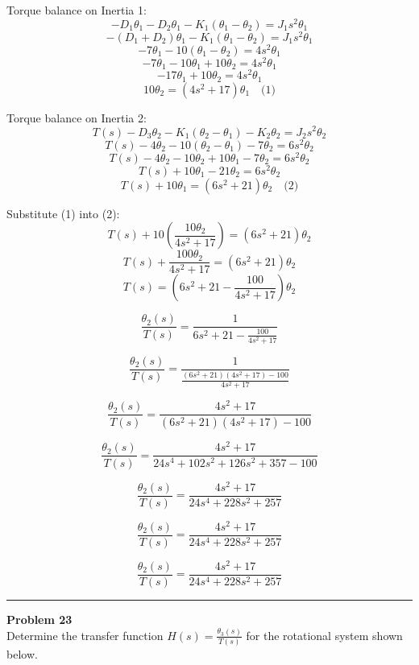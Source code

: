Torque balance on Inertia 1:
\[
- D_1 \theta_1 - D_2 \theta_1 - K_1 (\theta_1 - \theta_2) = J_1 s^2 \theta_1
\]
\[
- (D_1 + D_2)\theta_1 - K_1(\theta_1 - \theta_2) = J_1 s^2 \theta_1
\]
\[
-7\theta_1 - 10(\theta_1 - \theta_2) = 4s^2 \theta_1
\]
\[
-7\theta_1 - 10\theta_1 + 10\theta_2 = 4s^2 \theta_1
\]
\[
-17\theta_1 + 10\theta_2 = 4s^2 \theta_1
\]
\[
10\theta_2 = (4s^2 + 17)\theta_1 \quad \text{(1)}
\]

Torque balance on Inertia 2:
\[
T(s) - D_3 \theta_2 - K_1 (\theta_2 - \theta_1) - K_2 \theta_2 = J_2 s^2 \theta_2
\]
\[
T(s) - 4\theta_2 - 10(\theta_2 - \theta_1) - 7\theta_2 = 6s^2 \theta_2
\]
\[
T(s) - 4\theta_2 - 10\theta_2 + 10\theta_1 - 7\theta_2 = 6s^2 \theta_2
\]
\[
T(s) + 10\theta_1 - 21\theta_2 = 6s^2 \theta_2
\]
\[
T(s) + 10\theta_1 = (6s^2 + 21)\theta_2 \quad \text{(2)}
\]

Substitute (1) into (2):
\[
T(s) + 10\left( \frac{10\theta_2}{4s^2 + 17} \right) = (6s^2 + 21)\theta_2
\]
\[
T(s) + \frac{100\theta_2}{4s^2 + 17} = (6s^2 + 21)\theta_2
\]
\[
T(s) = \left( 6s^2 + 21 - \frac{100}{4s^2 + 17} \right)\theta_2
\]

\[
\frac{\theta_2(s)}{T(s)} = \frac{1}{6s^2 + 21 - \frac{100}{4s^2 + 17}}
\]

\[
\frac{\theta_2(s)}{T(s)} = \frac{1}{\frac{(6s^2 + 21)(4s^2 + 17) - 100}{4s^2 + 17}}
\]

\[
\frac{\theta_2(s)}{T(s)} = \frac{4s^2 + 17}{(6s^2 + 21)(4s^2 + 17) - 100}
\]

\[
\frac{\theta_2(s)}{T(s)} = \frac{4s^2 + 17}{24s^4 + 102s^2 + 126s^2 + 357 - 100}
\]

\[
\frac{\theta_2(s)}{T(s)} = \frac{4s^2 + 17}{24s^4 + 228s^2 + 257}
\]

\[
\frac{\theta_2(s)}{T(s)} = \frac{4s^2 + 17}{24s^4 + 228s^2 + 257}
\]

\[
\boxed{\frac{\theta_2(s)}{T(s)} = \frac{4s^2 + 17}{24s^4 + 228s^2 + 257}}
\]

\newpage

\noindent\rule{\textwidth}{1pt}
\noindent\textbf{Problem 23} \hfill
\\ Determine the transfer function \(H(s) = \frac{\theta_3(s)}{T(s)}\) for the rotational system shown below.

